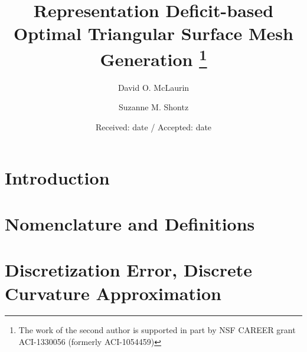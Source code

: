\documentclass[smallextended]{svjour3}       %
\begin{document}
\title{Representation Deficit-based Optimal Triangular Surface Mesh 
Generation
\thanks{The work of the second author is supported in part by NSF CAREER grant ACI-1330056 (formerly ACI-1054459)}
}

\author{
  David O. McLaurin \and
  Suzanne M. Shontz
}



\date{Received: date / Accepted: date}

\maketitle

\begin{abstract}

\end{abstract}

\section{Introduction}


\section{Nomenclature and Definitions}


\section{Discretization Error, Discrete Curvature Approximation}

\end{document}
